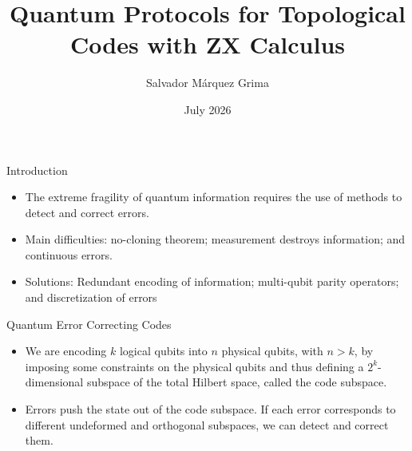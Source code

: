 \documentclass{beamer}
\title{Quantum Protocols for Topological Codes with ZX Calculus}
\author{Salvador Márquez Grima}
\date{July 2026}
\begin{document}
\maketitle

\begin{frame}{Introduction}
    \begin{itemize}
        \item The  extreme fragility of quantum information requires the use of methods to detect and correct errors.
        \item Main difficulties: no-cloning theorem; measurement destroys information; and continuous errors.
        \item Solutions: Redundant encoding of information; multi-qubit parity operators; and discretization of errors
    \end{itemize}
    
\end{frame}

\begin{frame}{Quantum Error Correcting Codes}
\begin{itemize}
    \item We are encoding $k$ logical qubits into $n$ physical qubits, with $n>k$, by imposing some constraints on the physical qubits and thus defining a $2^k$-dimensional subspace of the total Hilbert space, called the code subspace. \cite{NielsenChuang2010}
    \item Errors push the state out of the code subspace. If each error corresponds to different undeformed and orthogonal subspaces, we can detect and correct them.
\end{itemize}
\end{frame}
\end{document}
